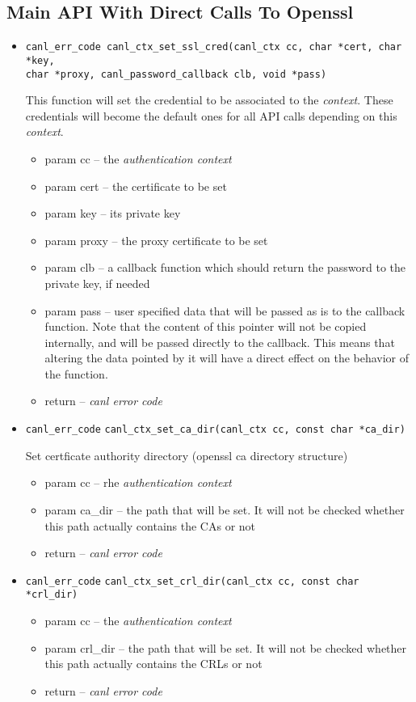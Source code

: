 \subsection{Main API With Direct Calls To Openssl}

\begin{itemize}
  \item \begin{verbatim}canl_err_code canl_ctx_set_ssl_cred(canl_ctx cc, char *cert, char *key,
char *proxy, canl_password_callback clb, void *pass)\end{verbatim}
  This function will set the credential to be associated to the
  \textit{context}.  These credentials will become the default ones 
  for all API calls depending on this \textit{context}.
  \begin{itemize}
    \item param cc -- the \textit{authentication context}
    \item param cert -- the certificate to be set
    \item param key -- its private key
    \item param proxy -- the proxy certificate to be set
    \item param clb -- a callback function which should return 
    the password to the private key, if needed
    \item param pass -- user specified data that will be passed 
    as is to the callback function.  Note that the content of this 
    pointer will not be copied internally, and will be passed
    directly to the callback.  This means that altering the 
    data pointed by it will have
    a direct effect on the behavior of the function.
    \item return -- \textit{canl error code}
  \end{itemize}
  \item \verb'canl_err_code'
  \verb'canl_ctx_set_ca_dir(canl_ctx cc, const char *ca_dir)'

  Set certficate authority directory (openssl ca directory structure)
    \begin{itemize} 
    \item param cc -- rhe \textit{authentication context}
    \item param ca\_dir -- the path that will be set.  It will not be 
    checked whether this path actually contains the CAs or not
    \item return -- \textit{canl error code}
    \end{itemize}
  \item \verb'canl_err_code'
  \verb'canl_ctx_set_crl_dir(canl_ctx cc, const char *crl_dir)'
    \begin{itemize} 
    \item param cc -- the \textit{authentication context}
    \item param crl\_dir -- the path that will be set.  It will not be 
    checked whether this path actually contains the CRLs or not
    \item return -- \textit{canl error code}
    \end{itemize}


\end{itemize}
